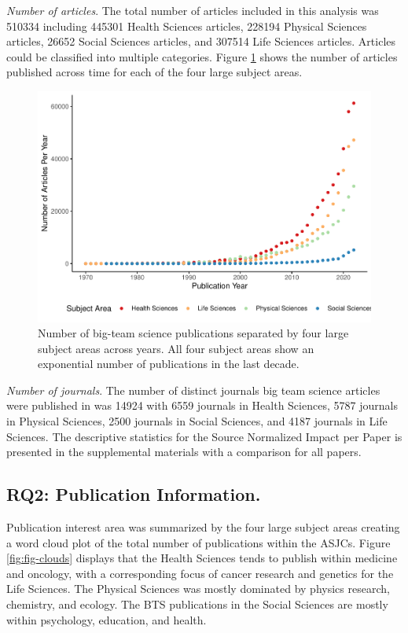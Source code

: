\documentclass[
  man,floatsintext]{apa6}
\begin{document}
\emph{Number of articles}. The total number of articles included in this
analysis was 510334 including 445301 Health Sciences
articles, 228194 Physical Sciences articles, 26652
Social Sciences articles, and 307514 Life Sciences articles.
Articles could be classified into multiple categories. Figure
\ref{fig:fig-pub-time} shows the number of articles published across
time for each of the four large subject areas.

\begin{figure}
\centering
\includegraphics{manuscript_scopus_files/figure-latex/fig-pub-time-1.pdf}
\caption{\label{fig:fig-pub-time}Number of big-team science publications separated by four large subject areas across years. All four subject areas show an exponential number of publications in the last decade.}
\end{figure}

\emph{Number of journals}. The number of distinct journals big team science
articles were published in was 14924 with 6559
journals in Health Sciences, 5787 journals in Physical
Sciences, 2500 journals in Social Sciences, and
4187 journals in Life Sciences. The descriptive statistics
for the Source Normalized Impact per Paper is presented in the
supplemental materials with a comparison for all papers.

\hypertarget{rq2-publication-information.}{%
\subsection{RQ2: Publication Information.}\label{rq2-publication-information.}}

Publication interest area was summarized by the four large subject areas
creating a word cloud plot of the total number of publications within
the ASJCs. Figure \ref{fig:fig-clouds} displays that the Health
Sciences tends to publish within medicine and oncology, with a
corresponding focus of cancer research and genetics for the Life
Sciences. The Physical Sciences was mostly dominated by physics
research, chemistry, and ecology. The BTS publications in the Social
Sciences are mostly within psychology, education, and health.
\end{document}
